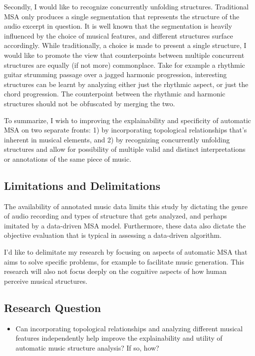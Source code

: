 Secondly, I would like to recognize concurrently unfolding structures. Traditional MSA only produces a single segmentation that represents the structure of the audio excerpt in question. 
It is well known that the segmentation is heavily influenced by the choice of musical features, and different structures surface accordingly. 
While traditionally, a choice is made to present a single structure, I would like to promote the view that counterpoints between multiple concurrent structures are equally (if not more) commonplace. 
Take for example a rhythmic guitar strumming passage over a jagged harmonic progression, interesting structures can be learnt by analyzing either just the rhythmic aspect, or just the chord progression. 
The counterpoint between the rhythmic and harmonic structures should not be obfuscated by merging the two.

To summarize, I wish to improving the explainability and specificity of automatic MSA on two separate fronts: 1) by incorporating topological relationships that’s inherent in musical elements, and 2) by recognizing concurrently unfolding structures and allow for possibility of multiple valid and distinct interpretations or annotations of the same piece of music.

\subsection{Limitations and Delimitations}
The availability of annotated music data limits this study by dictating the genre of audio recording and types of structure that gets analyzed, and perhaps imitated by a data-driven MSA model. 
Furthermore, these data also dictate the objective evaluation that is typical in assessing a data-driven algorithm.

I’d like to delimitate my research by focusing on aspects of automatic MSA that aims to solve specific problems, for example to facilitate music generation. 
This research will also not focus deeply on the cognitive aspects of how human perceive musical structures.

\subsection{Research Question}
\begin{itemize}
	\item Can incorporating topological relationships and analyzing different musical features independently help improve the explainability and utility of automatic music structure analysis? If so, how?
\end{itemize}

